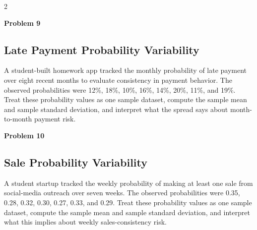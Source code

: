 \documentclass[12pt]{article}
\newcommand{\SubsectionBox}[1]{%
\noindent\colorbox{gray!30}{\parbox{\linewidth}{\textbf{#1}}}\par\vspace{0.35cm}%
}
\begin{document}
\begin{multicols}{2}
\vspace{0.5cm}
\SubsectionBox{Problem 9}
\subsection*{Late Payment Probability Variability}
A student-built homework app tracked the monthly probability of late payment over eight recent months to evaluate consistency in payment behavior. The observed probabilities were 12\%, 18\%, 10\%, 16\%, 14\%, 20\%, 11\%, and 19\%. Treat these probability values as one sample dataset, compute the sample mean and sample standard deviation, and interpret what the spread says about month-to-month payment risk.

\vspace{0.5cm}
\SubsectionBox{Problem 10}
\subsection*{Sale Probability Variability}
A student startup tracked the weekly probability of making at least one sale from social-media outreach over seven weeks. The observed probabilities were 0.35, 0.28, 0.32, 0.30, 0.27, 0.33, and 0.29. Treat these probability values as one sample dataset, compute the sample mean and sample standard deviation, and interpret what this implies about weekly sales-consistency risk.

\end{multicols}
\end{document}
